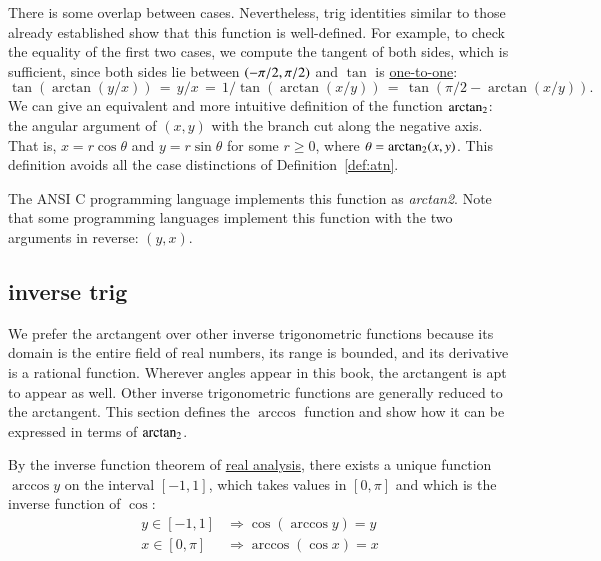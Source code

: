 There is some overlap between cases. Nevertheless, trig identities
similar to those already established show that this function is
well-defined.  For example, to check the equality of the first two
cases, we compute the tangent of both sides, which is sufficient,
since both sides lie between $(-\pi/2,\pi/2)$ and
$\tan$ is \hyperref[lemma:tan-monotone]{one-to-one}:
\begin{displaymath}
  \tan(\arctan(y/x)) \hyperref[def:arctan]{\,=\,} y/x \hyperref[def:arctan]{\,=\,} 
  1/\tan(\arctan(x/y)) \hyperref[lemma:cos-sin]{\,=\,} \tan(\pi/2 - \arctan(x/y)).
\end{displaymath}
We can give an equivalent and more intuitive definition of
the function ${\operatorname{arctan_2}}$:    the angular argument of $(x,y)$ with the
branch cut along the negative axis.  That is, $x = r\cos\theta$ and
$y=r\sin\theta$ for some $r\ge0$, where $\theta={\operatorname{arctan_2}}(x,y)$.  This definition avoids all
the case distinctions of Definition~\ref{def:atn}.

The ANSI C programming language implements this function as {\it
  arctan2}.  Note that some programming languages implement this
function with the two arguments in reverse: $(y,x)$.
%
%
%
%


\subsection{inverse trig}
%

We prefer the arctangent over other inverse trigonometric functions
because its domain is the entire field of real numbers, its range is
bounded, and its derivative is a rational function.  Wherever angles
appear in this book, the arctangent is apt to appear as well.  Other
inverse trigonometric functions are generally  reduced to the
arctangent.  This section defines the $\arccos$ function and show how
it can be expressed in terms of ${\operatorname{arctan_2}}$.

\begin{definition}[arccos]
\label{def:arccos}
  By the inverse function theorem of \hyperref[back:analysis]{real
    analysis}, there exists a unique function $\arccos y$ on the
  interval $[-1,1]$, which takes values in $[0,\pi]$ and which is the
  inverse function of $\cos$:
\begin{align*}
y\in [-1,1] &\Rightarrow \cos(\arccos y) = y\\
x\in[0,\pi] &\Rightarrow \arccos(\cos x) = x
\end{align*}
%
%
\end{definition}

